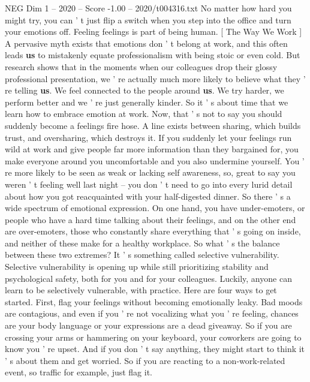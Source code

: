 \begin{textsample}{NEG Dim 1 – 2020 – Score -1.00 – 2020/t004316.txt}  \label{ex:f1_neg_009}
No matter how hard you might try, you can ' t just flip a switch when you step into the office and turn your emotions off.
Feeling feelings is part of being human. [ The Way We Work ] A pervasive myth exists that emotions don ' t belong at work, and this often leads \textbf{us} to mistakenly equate professionalism with being stoic or even cold.
But research shows that in the moments when our colleagues drop their glossy professional presentation, we ' re actually much more likely to believe what they ' re telling \textbf{us}.
We feel connected to the people around \textbf{us}.
We try harder, we perform better and we ' re just generally kinder.
So it ' s about time that we learn how to embrace emotion at work.
Now, that ' s not to say you should suddenly become a feelings fire hose.
A line exists between sharing, which builds trust, and oversharing, which destroys it.
If you suddenly let your feelings run wild at work and give people far more information than they bargained for, you make everyone around you uncomfortable and you also undermine yourself.
You ' re more likely to be seen as weak or lacking self awareness, so, great to say you weren ' t feeling well last night -- you don ' t need to go into every lurid detail about how you got reacquainted with your half-digested dinner.
So there ' s a wide spectrum of emotional expression.
On one hand, you have under-emoters, or people who have a hard time talking about their feelings, and on the other end are over-emoters, those who constantly share everything that ' s going on inside, and neither of these make for a healthy workplace.
So what ' s the balance between these two extremes?
It ' s something called selective vulnerability.
Selective vulnerability is opening up while still prioritizing stability and psychological safety, both for you and for your colleagues.
Luckily, anyone can learn to be selectively vulnerable, with practice.
Here are four ways to get started.
First, flag your feelings without becoming emotionally leaky.
Bad moods are contagious, and even if you ' re not vocalizing what you ' re feeling, chances are your body language or your expressions are a dead giveaway.
So if you are crossing your arms or hammering on your keyboard, your coworkers are going to know you ' re upset.
And if you don ' t say anything, they might start to think it ' s about them and get worried.
So if you are reacting to a non-work-related event, so traffic for example, just flag it.

\end{textsample}
